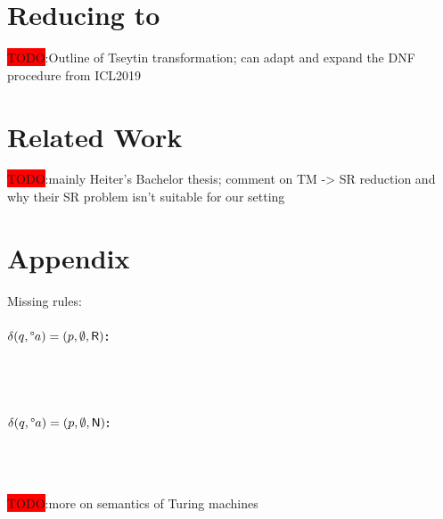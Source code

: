 \documentclass[a4paper,UKenglish,cleveref, autoref]{lipics-v2019}
\newcommand{\TODO}[1]{\colorbox{red}{\LARGE TODO}:#1}
\begin{document}
\section{Reducing \csat{} to \sat{}}
\TODO{Outline of Tseytin transformation; can adapt and expand the DNF procedure from ICL2019}

\section{Related Work}
\TODO{mainly Heiter's Bachelor thesis; comment on TM -> SR reduction and why their SR problem isn't suitable for our setting}

\appendix
\section{Appendix}
Missing rules:
\paragraph*{$\delta(q, \degree a) = (p, \emptyset, \textsf{R})$:}
\begin{center}
   \\[3ex]
   \\[3ex]
\end{center}

\paragraph*{$\delta(q, \degree a) = (p, \emptyset, \textsf{N})$:}
\begin{center}
   \\[3ex]
   \\[3ex]
\end{center}

\TODO{more on semantics of Turing machines}

{}
\end{document}
